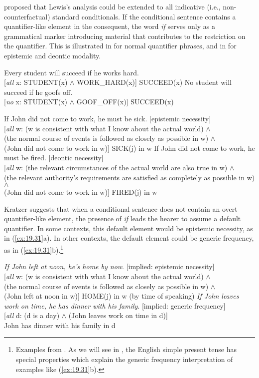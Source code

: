 \citet{Kratzer1986} proposed that Lewis’s analysis could be extended to all indicative (i.e., non-counterfactual) standard conditionals. If the conditional sentence contains a quantifier-like element in the consequent, the word \textit{if} serves only as a grammatical marker introducing material that contributes to the restriction on the quantifier. This is illustrated in  for normal quantifier phrases, and in  for epistemic and deontic modality.


\ea \label{ex:19.29}
\ea   Every student will succeed if he works hard.\\
{}[\textit{all} x: STUDENT(x) $\wedge$ WORK\_HARD(x)] SUCCEED(x)
\ex  No student will succeed if he goofs off.\\
{}[\textit{no} x: STUDENT(x) $\wedge$ GOOF\_OFF(x)] SUCCEED(x)
\z \z

\ea \label{ex:19.30}
\ea   If John did not come to work, he must be sick.  [epistemic necessity]\\
  {}[\textit{all} w: (w is consistent with what I know about the actual world) $\wedge$\\
  (the normal course of events is followed as closely as possible in w) $\wedge$\\
  (John did not come to work in w)] SICK(j) in w
\ex  If John did not come to work, he must be fired.  [deontic necessity]\\
  {}[\textit{all} w: (the relevant circumstances of the actual world are also true in w) $\wedge$\\
  (the relevant authority’s requirements are satisfied as completely as possible in w) $\wedge$\\
  (John did not come to work in w)] FIRED(j) in w
\z \z


Kratzer suggests that when a conditional sentence does not contain an overt quantifier-like element, the presence of \textit{if} leads the hearer to assume a default quantifier. In some contexts, this default element would be epistemic necessity, as in (\ref{ex:19.31}a). In other contexts, the default element could be generic frequency, as in (\ref{ex:19.31}b).\footnote{Examples from . As we will see in , the English simple present tense has special properties which explain the generic frequency interpretation of examples like (\ref{ex:19.31}b).}


\ea \label{ex:19.31}
\ea  \textit{If John left at noon, he’s home by now}.   [implied: epistemic necessity]\\
  {}[\textit{all} w: (w is consistent with what I know about the actual world) $\wedge$\\
  (the normal course of events is followed as closely as possible in w) $\wedge$\\
  (John left at noon in w)] HOME(j) in w (by time of speaking)
\ex \textit{If John leaves work on time, he has dinner with his family}. [implied: generic frequency]\\
  {}[\textit{all} d: (d is a day) $\wedge$ (John leaves work on time in d)]\\
    John has dinner with his family in d
\z \z


